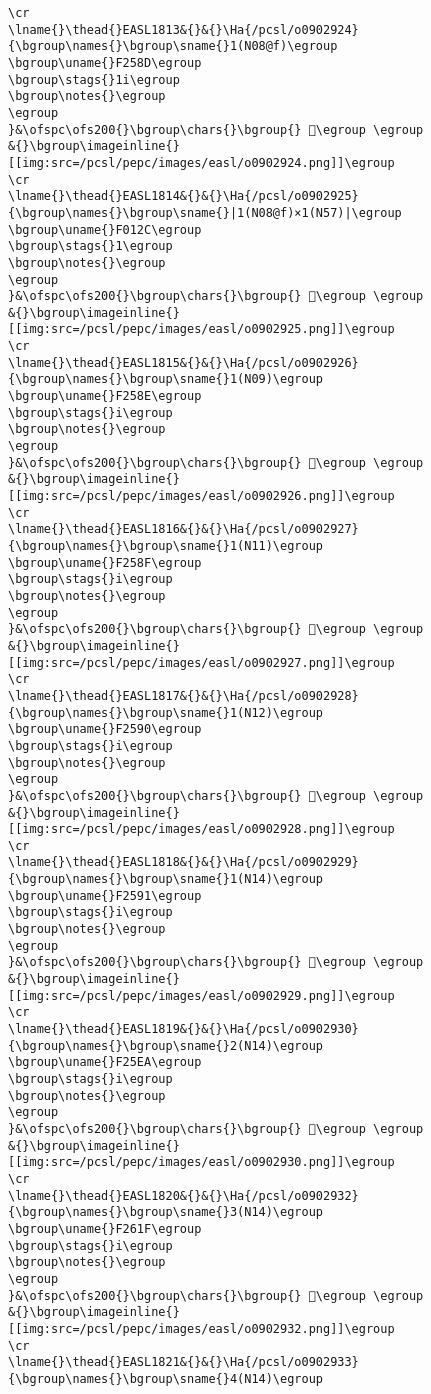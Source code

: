 \begin{verbatim}
\cr
\lname{}\thead{}EASL1813&{}&{}\Ha{/pcsl/o0902924}{\bgroup\names{}\bgroup\sname{}1(N08@f)\egroup
\bgroup\uname{}F258D\egroup
\bgroup\stags{}1i\egroup
\bgroup\notes{}\egroup
\egroup
}&\ofspc\ofs200{}\bgroup\chars{}\bgroup{} 󲖍\egroup \egroup
&{}\bgroup\imageinline{}[[img:src=/pcsl/pepc/images/easl/o0902924.png]]\egroup
\cr
\lname{}\thead{}EASL1814&{}&{}\Ha{/pcsl/o0902925}{\bgroup\names{}\bgroup\sname{}|1(N08@f)×1(N57)|\egroup
\bgroup\uname{}F012C\egroup
\bgroup\stags{}1\egroup
\bgroup\notes{}\egroup
\egroup
}&\ofspc\ofs200{}\bgroup\chars{}\bgroup{} 󰄬\egroup \egroup
&{}\bgroup\imageinline{}[[img:src=/pcsl/pepc/images/easl/o0902925.png]]\egroup
\cr
\lname{}\thead{}EASL1815&{}&{}\Ha{/pcsl/o0902926}{\bgroup\names{}\bgroup\sname{}1(N09)\egroup
\bgroup\uname{}F258E\egroup
\bgroup\stags{}i\egroup
\bgroup\notes{}\egroup
\egroup
}&\ofspc\ofs200{}\bgroup\chars{}\bgroup{} 󲖎\egroup \egroup
&{}\bgroup\imageinline{}[[img:src=/pcsl/pepc/images/easl/o0902926.png]]\egroup
\cr
\lname{}\thead{}EASL1816&{}&{}\Ha{/pcsl/o0902927}{\bgroup\names{}\bgroup\sname{}1(N11)\egroup
\bgroup\uname{}F258F\egroup
\bgroup\stags{}i\egroup
\bgroup\notes{}\egroup
\egroup
}&\ofspc\ofs200{}\bgroup\chars{}\bgroup{} 󲖏\egroup \egroup
&{}\bgroup\imageinline{}[[img:src=/pcsl/pepc/images/easl/o0902927.png]]\egroup
\cr
\lname{}\thead{}EASL1817&{}&{}\Ha{/pcsl/o0902928}{\bgroup\names{}\bgroup\sname{}1(N12)\egroup
\bgroup\uname{}F2590\egroup
\bgroup\stags{}i\egroup
\bgroup\notes{}\egroup
\egroup
}&\ofspc\ofs200{}\bgroup\chars{}\bgroup{} 󲖐\egroup \egroup
&{}\bgroup\imageinline{}[[img:src=/pcsl/pepc/images/easl/o0902928.png]]\egroup
\cr
\lname{}\thead{}EASL1818&{}&{}\Ha{/pcsl/o0902929}{\bgroup\names{}\bgroup\sname{}1(N14)\egroup
\bgroup\uname{}F2591\egroup
\bgroup\stags{}i\egroup
\bgroup\notes{}\egroup
\egroup
}&\ofspc\ofs200{}\bgroup\chars{}\bgroup{} 󲖑\egroup \egroup
&{}\bgroup\imageinline{}[[img:src=/pcsl/pepc/images/easl/o0902929.png]]\egroup
\cr
\lname{}\thead{}EASL1819&{}&{}\Ha{/pcsl/o0902930}{\bgroup\names{}\bgroup\sname{}2(N14)\egroup
\bgroup\uname{}F25EA\egroup
\bgroup\stags{}i\egroup
\bgroup\notes{}\egroup
\egroup
}&\ofspc\ofs200{}\bgroup\chars{}\bgroup{} 󲗪\egroup \egroup
&{}\bgroup\imageinline{}[[img:src=/pcsl/pepc/images/easl/o0902930.png]]\egroup
\cr
\lname{}\thead{}EASL1820&{}&{}\Ha{/pcsl/o0902932}{\bgroup\names{}\bgroup\sname{}3(N14)\egroup
\bgroup\uname{}F261F\egroup
\bgroup\stags{}i\egroup
\bgroup\notes{}\egroup
\egroup
}&\ofspc\ofs200{}\bgroup\chars{}\bgroup{} 󲘟\egroup \egroup
&{}\bgroup\imageinline{}[[img:src=/pcsl/pepc/images/easl/o0902932.png]]\egroup
\cr
\lname{}\thead{}EASL1821&{}&{}\Ha{/pcsl/o0902933}{\bgroup\names{}\bgroup\sname{}4(N14)\egroup

\end{verbatim}
